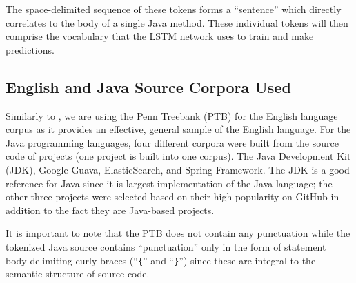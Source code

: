 \documentclass[runningheads,a4paper]{llncs}
\begin{document}
The space-delimited sequence of these tokens forms a ``sentence'' which  
directly  correlates to the body of a single Java method. These individual  
tokens will then comprise the vocabulary that the LSTM network uses to train 
and make predictions.
\fi

\subsection{English and Java Source Corpora Used}

Similarly to \citet{LSTMArticle}, we are using the Penn Treebank (PTB) for the
English language corpus as it provides an effective, general sample of the English
language. %
For the Java programming languages, four different corpora were built from
the source code of projects (one project is built into one corpus). The
Java Development Kit (JDK), Google Guava, ElasticSearch, and Spring Framework.
The JDK is a good reference for Java since it is largest implementation
of the Java language; the other three projects were selected based on their
high popularity on GitHub in addition to the fact they are
Java-based projects.

It is important to note that the
PTB does not contain any punctuation while the tokenized
Java source contains ``punctuation'' only in the form of statement
body-delimiting curly braces (``\texttt\{'' and ``\texttt\}'')
since these are integral to the semantic structure of source code.

\end{document}
